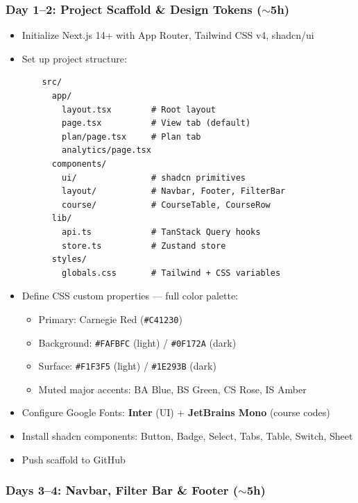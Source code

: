 \documentclass[11pt]{article}
\begin{document}
\subsubsection{Day 1--2: Project Scaffold \& Design Tokens ($\sim$5h)}

\begin{itemize}[leftmargin=2em]
    \item Initialize Next.js 14+ with App Router, Tailwind CSS v4, shadcn/ui
    \item Set up project structure:
    \begin{verbatim}
    src/
      app/
        layout.tsx        # Root layout
        page.tsx          # View tab (default)
        plan/page.tsx     # Plan tab
        analytics/page.tsx
      components/
        ui/               # shadcn primitives
        layout/           # Navbar, Footer, FilterBar
        course/           # CourseTable, CourseRow
      lib/
        api.ts            # TanStack Query hooks
        store.ts          # Zustand store
      styles/
        globals.css       # Tailwind + CSS variables
    \end{verbatim}
    \item Define CSS custom properties — full color palette:
    \begin{itemize}
        \item Primary: Carnegie Red (\texttt{\#C41230})
        \item Background: \texttt{\#FAFBFC} (light) / \texttt{\#0F172A} (dark)
        \item Surface: \texttt{\#F1F3F5} (light) / \texttt{\#1E293B} (dark)
        \item Muted major accents: BA Blue, BS Green, CS Rose, IS Amber
    \end{itemize}
    \item Configure Google Fonts: \textbf{Inter} (UI) + \textbf{JetBrains Mono} (course codes)
    \item Install shadcn components: Button, Badge, Select, Tabs, Table, Switch, Sheet
    \item Push scaffold to GitHub
\end{itemize}

\subsubsection{Days 3--4: Navbar, Filter Bar \& Footer ($\sim$5h)}
\end{document}
